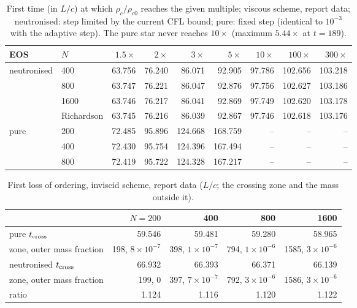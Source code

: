 \documentclass[11pt]{article}
\begin{document}
\begin{table}[t]
\centering\small
\caption{First time (in $L/c$) at which $\rho_c/\rho_{c0}$ reaches the given multiple; viscous scheme, report data; neutronised: step limited by the current CFL bound; pure: fixed step (identical to $10^{-3}$ with the adaptive step). The pure star never reaches $10\times$ (maximum $5.44\times$ at $t=189$).}
\label{tab:lag-collapse}
\begin{tabular}{llrrrrrrr}
\hline
EOS & $N$ & $1.5\times$ & $2\times$ & $3\times$ & $5\times$ & $10\times$ & $100\times$ & $300\times$\\
\hline
neutronised & 400 & 63.756 & 76.240 & 86.071 & 92.905 & 97.786 & 102.656 & 103.218\\
 & 800 & 63.747 & 76.221 & 86.047 & 92.876 & 97.756 & 102.627 & 103.186\\
 & 1600 & 63.746 & 76.217 & 86.041 & 92.869 & 97.749 & 102.620 & 103.178\\
 & Richardson & 63.745 & 76.216 & 86.039 & 92.867 & 97.746 & 102.618 & 103.176\\
pure & 200 & 72.485 & 95.896 & 124.668 & 168.759 & -- & -- & --\\
 & 400 & 72.430 & 95.754 & 124.396 & 167.494 & -- & -- & --\\
 & 800 & 72.419 & 95.722 & 124.328 & 167.217 & -- & -- & --\\
\hline
\end{tabular}
\end{table}

\begin{table}[t]
\centering\small
\caption{First loss of ordering, inviscid scheme, report data ($L/c$; the crossing zone and the mass outside it).}
\label{tab:lag-edge}
\begin{tabular}{lrrrr}
\hline
 & $N=200$ & 400 & 800 & 1600\\
\hline
pure $t_{\rm cross}$ & 59.546 & 59.481 & 59.280 & 58.965\\
\quad zone, outer mass fraction & 198, $8\times10^{-7}$ & 398, $1\times10^{-7}$ & 794, $1\times10^{-6}$ & 1585, $3\times10^{-6}$\\
neutronised $t_{\rm cross}$ & 66.932 & 66.393 & 66.371 & 66.139\\
\quad zone, outer mass fraction & 199, 0 & 397, $7\times10^{-7}$ & 792, $3\times10^{-6}$ & 1586, $3\times10^{-6}$\\
ratio & 1.124 & 1.116 & 1.120 & 1.122\\
\hline
\end{tabular}
\end{table}
\end{document}
